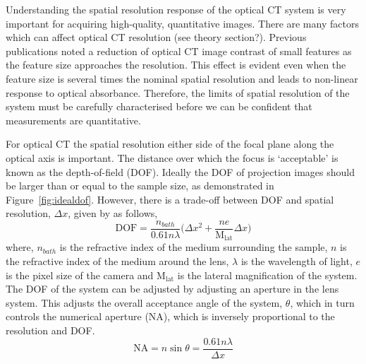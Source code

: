 Understanding the spatial resolution response of the optical CT system is very important for acquiring high-quality, quantitative images. There are many factors which can affect optical CT resolution (see theory section?).
Previous publications noted a reduction of optical CT image contrast of small features as the feature size approaches the resolution. \cite{doranultra-high2013} This effect is evident even when the feature size is several times the nominal spatial resolution and leads to non-linear response to optical absorbance. Therefore, the limits of spatial resolution of the system must be carefully characterised before we can be confident that measurements are quantitative. 

For optical CT the spatial resolution either side of the focal plane along the optical axis is important. The distance over which the focus is `acceptable' is known as the depth-of-field (DOF).
Ideally the DOF of projection images should be larger than or equal to the sample size, as demonstrated in Figure~\ref{fig:idealdof}. However, there is a trade-off between DOF and spatial resolution,  $\Delta x$, given by \cite{inoue1997video} as follows,
\begin{equation}
\mathrm{DOF} = \frac{n_{bath}}{0.61 n \lambda} \big(\Delta x^2 + \frac{ne}{\mathrm{M_{lat}}} \Delta x \big)
\label{eqn:1DOF}
\end{equation}
where, $n_{bath}$ is the refractive index of the medium surrounding the sample, $n$ is the refractive index of the medium around the lens, $\lambda$ is the wavelength of light, $e$ is the pixel size of the camera and $\mathrm{M_{lat}}$ is the lateral magnification of the system. The DOF of the system can be adjusted by adjusting an aperture in the lens system. This adjusts the overall acceptance angle of the system, $\theta$, which in turn controls the numerical aperture (NA), which is inversely proportional to the resolution and DOF.
\begin{equation}
\mathrm{NA} = n \sin \theta = \frac{0.61n\lambda}{\Delta x}
\label{eqn:2NA}
\end{equation}


